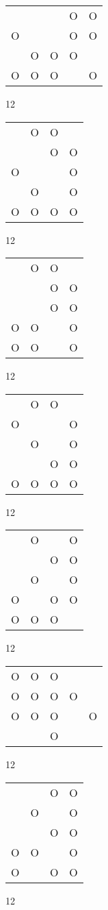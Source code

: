 \begin{tabular}{|m{0.2cm}m{0.2cm}m{0.2cm}m{0.2cm}m{0.2cm}|}\hline
 & & &O&O\\
O& & &O&O\\
 &O&O&O& \\
O&O&O& &O\\
\hline\end{tabular}12
\begin{tabular}{|m{0.2cm}m{0.2cm}m{0.2cm}m{0.2cm}|}\hline
 &O&O& \\
 & &O&O\\
O& & &O\\
 &O& &O\\
O&O&O&O\\
\hline\end{tabular}12
\begin{tabular}{|m{0.2cm}m{0.2cm}m{0.2cm}m{0.2cm}|}\hline
 &O&O& \\
 & &O&O\\
 & &O&O\\
O&O& &O\\
O&O& &O\\
\hline\end{tabular}12
\begin{tabular}{|m{0.2cm}m{0.2cm}m{0.2cm}m{0.2cm}|}\hline
 &O&O& \\
O& & &O\\
 &O& &O\\
 & &O&O\\
O&O&O&O\\
\hline\end{tabular}12
\begin{tabular}{|m{0.2cm}m{0.2cm}m{0.2cm}m{0.2cm}|}\hline
 &O& &O\\
 & &O&O\\
 &O& &O\\
O& &O&O\\
O&O&O& \\
\hline\end{tabular}12
\begin{tabular}{|m{0.2cm}m{0.2cm}m{0.2cm}m{0.2cm}m{0.2cm}|}\hline
O&O&O& & \\
O&O&O&O& \\
O&O&O& &O\\
 & &O& & \\
\hline\end{tabular}12
\begin{tabular}{|m{0.2cm}m{0.2cm}m{0.2cm}m{0.2cm}|}\hline
 & &O&O\\
 &O& &O\\
 & &O&O\\
O&O& &O\\
O& &O&O\\
\hline\end{tabular}12
